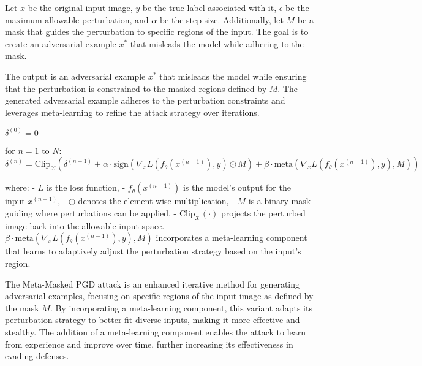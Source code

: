 Let $x$ be the original input image, $y$ be the true label associated with it, $\epsilon$ be the maximum allowable perturbation, and $\alpha$ be the step size. Additionally, let $M$ be a mask that guides the perturbation to specific regions of the input. The goal is to create an adversarial example $x^*$ that misleads the model while adhering to the mask.

The output is an adversarial example $x^*$ that misleads the model while ensuring that the perturbation is constrained to the masked regions defined by $M$. The generated adversarial example adheres to the perturbation constraints and leverages meta-learning to refine the attack strategy over iterations.


$\delta^{(0)} = 0$

for $n = 1 \text{ to } N$:
    $\delta^{(n)} = \text{Clip}_{\mathcal{X}} \left( \delta^{(n-1)} + \alpha \cdot \text{sign} \left( \nabla_x L(f_\theta(x^{(n-1)}), y) \odot M \right) + \beta \cdot \text{meta}(\nabla_x L(f_\theta(x^{(n-1)}), y), M) \right)$

where:
- $L$ is the loss function,
- $f_\theta(x^{(n-1)})$ is the model's output for the input $x^{(n-1)}$,
- $\odot$ denotes the element-wise multiplication,
- $M$ is a binary mask guiding where perturbations can be applied,
- $\text{Clip}_{\mathcal{X}}(\cdot)$ projects the perturbed image back into the allowable input space.
- $\beta \cdot \text{meta}(\nabla_x L(f_\theta(x^{(n-1)}), y), M)$ incorporates a meta-learning component that learns to adaptively adjust the perturbation strategy based on the input's region.

The Meta-Masked PGD attack is an enhanced iterative method for generating adversarial examples, focusing on specific regions of the input image as defined by the mask $M$. By incorporating a meta-learning component, this variant adapts its perturbation strategy to better fit diverse inputs, making it more effective and stealthy. The addition of a meta-learning component enables the attack to learn from experience and improve over time, further increasing its effectiveness in evading defenses.